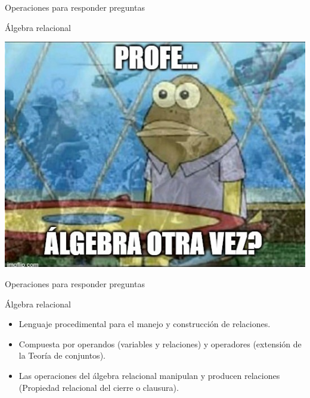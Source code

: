\begin{frame}{Operaciones para responder preguntas}
    \begin{block}{\'Algebra relacional}  
    \end{block}

\end{frame}


{
{
    \includegraphics[width=\paperwidth,height=\paperheight]{img/flashback.jpg}
}
\begin{frame}
\end{frame}
}


\begin{frame}{Operaciones para responder preguntas}
    \begin{block}{\'Algebra relacional}
        \begin{itemize}
            \item Lenguaje procedimental para el manejo y construcci\'on de relaciones.
            \item Compuesta por operandos (variables y relaciones) y operadores (extensi\'on
            de la Teor\'ia de conjuntos).
            \item Las operaciones del \'algebra relacional manipulan y producen
            relaciones (Propiedad relacional del cierre o clausura).
        \end{itemize}    
    \end{block}

\end{frame}


